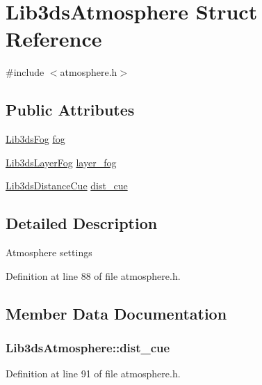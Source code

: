 \hypertarget{struct_lib3ds_atmosphere}{\section{Lib3ds\-Atmosphere Struct Reference}
\label{struct_lib3ds_atmosphere}
}


{\ttfamily \#include $<$atmosphere.\-h$>$}

\subsection*{Public Attributes}
\begin{DoxyCompactItemize}
\item 
\hyperlink{struct_lib3ds_fog}{Lib3ds\-Fog} \hyperlink{struct_lib3ds_atmosphere_a5762e9af51d3a3bb910337a760527280}{fog}
\item 
\hyperlink{struct_lib3ds_layer_fog}{Lib3ds\-Layer\-Fog} \hyperlink{struct_lib3ds_atmosphere_a3875fa8e37df9b8a31d72221d8ac59f6}{layer\-\_\-fog}
\item 
\hyperlink{struct_lib3ds_distance_cue}{Lib3ds\-Distance\-Cue} \hyperlink{struct_lib3ds_atmosphere_a21c324ca5c18db49273e7a0e6a8e7813}{dist\-\_\-cue}
\end{DoxyCompactItemize}


\subsection{Detailed Description}
Atmosphere settings 

Definition at line 88 of file atmosphere.\-h.



\subsection{Member Data Documentation}
\hypertarget{struct_lib3ds_atmosphere_a21c324ca5c18db49273e7a0e6a8e7813}{
\subsubsection[{dist\-\_\-cue}]{ Lib3ds\-Atmosphere\-::dist\-\_\-cue}}\label{struct_lib3ds_atmosphere_a21c324ca5c18db49273e7a0e6a8e7813}


Definition at line 91 of file atmosphere.\-h.

